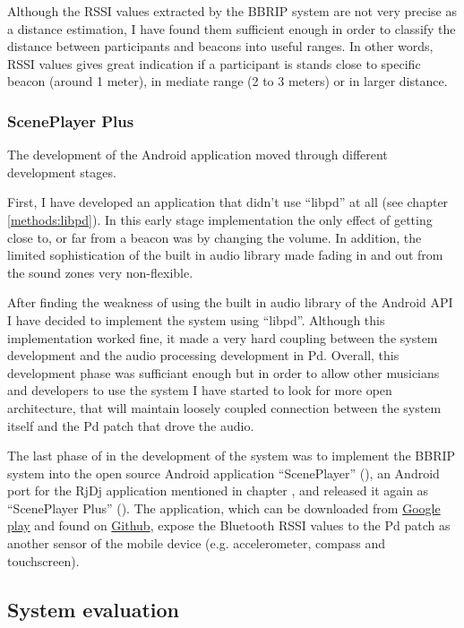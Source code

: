 Although the RSSI values extracted by the BBRIP system are not very precise as a distance estimation, I have found them sufficient enough in order to classify the distance between participants and beacons into useful ranges. In other words, RSSI values gives great indication if a participant is stands close to specific beacon (around 1 meter), in mediate range (2 to 3 meters) or in larger distance.

\subsubsection{ScenePlayer Plus}

The development of the Android application moved through different development stages.

First, I have developed an application that didn't use ``libpd'' at all (see chapter \ref{methods:libpd}). In this early stage implementation the only effect of getting close to, or far from a beacon was by changing the volume. In addition, the limited sophistication of the built in audio library made fading in and out from the sound zones very non-flexible.

After finding the weakness of using the built in audio library of the Android API I have decided to implement the system using ``libpd''. Although this implementation worked fine, it made a very hard coupling between the system development and the audio processing development in Pd. Overall, this development phase was sufficiant enough but in order to allow other musicians and developers to use the system I have started to look for more open architecture, that will maintain loosely coupled connection between the system itself and the Pd patch that drove the audio.

The last phase of in the development of the system was to implement the BBRIP system into the open source Android application ``ScenePlayer'' (), an Android port for the RjDj application mentioned in chapter , and released it again as ``ScenePlayer Plus'' (). The application, which can be downloaded from \href{}{Google play} and found on \href{}{Github}, expose the Bluetooth RSSI values to the Pd patch as another sensor of the mobile device (e.g. accelerometer, compass and touchscreen).

\subsection{System evaluation}

